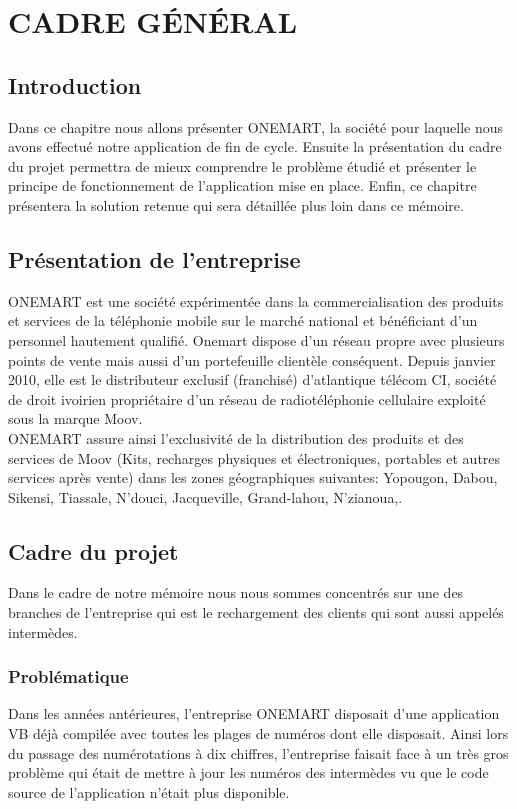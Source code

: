 \chapter{CADRE GÉNÉRAL}
\section{Introduction}
	Dans ce chapitre nous allons présenter ONEMART, la société pour laquelle nous avons effectué notre application de fin de cycle. Ensuite la présentation du cadre du projet permettra de mieux comprendre le problème étudié et présenter le principe de fonctionnement de l'application mise en place.
	Enfin, ce chapitre présentera la solution retenue qui sera détaillée plus loin dans ce mémoire.
\section{Présentation de l'entreprise}
	ONEMART est une société expérimentée dans la commercialisation des produits et services de la téléphonie mobile sur le marché national et bénéficiant d’un personnel hautement qualifié. Onemart dispose d’un réseau propre avec plusieurs points de vente mais aussi d’un portefeuille clientèle conséquent. Depuis janvier 2010, elle est le distributeur exclusif (franchisé) d’atlantique télécom CI, société de droit ivoirien propriétaire d’un réseau de radiotéléphonie cellulaire  exploité sous la marque Moov.\\
	
	ONEMART assure ainsi l’exclusivité de la distribution des produits et des services de Moov (Kits, recharges physiques et électroniques, portables et autres services après vente) dans les zones géographiques suivantes: Yopougon, Dabou, Sikensi, Tiassale, N’douci, Jacqueville, Grand-lahou, N’zianoua,.\\
	
	
\section{Cadre du projet} %
	Dans le cadre de notre mémoire nous nous sommes concentrés sur une des branches de l'entreprise qui est le rechargement des clients qui sont aussi appelés intermèdes.
\subsection{Problématique}
		Dans les années antérieures, l'entreprise ONEMART disposait d'une application VB déjà compilée avec toutes les plages de numéros dont elle disposait. Ainsi lors du passage des numérotations à dix chiffres, l'entreprise faisait face à un très gros problème qui était de mettre à jour les numéros des intermèdes vu que le code source de l'application n'était plus disponible.
